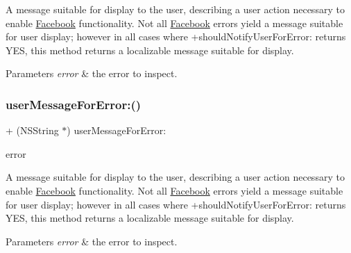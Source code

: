 A message suitable for display to the user, describing a user action necessary to enable \hyperlink{interfaceFacebook}{Facebook} functionality. Not all \hyperlink{interfaceFacebook}{Facebook} errors yield a message suitable for user display; however in all cases where +should\+Notify\+User\+For\+Error\+: returns Y\+ES, this method returns a localizable message suitable for display.


\begin{DoxyParams}{Parameters}
{\em error} & the error to inspect. \\
\hline
\end{DoxyParams}
\mbox{\label{interfaceFBErrorUtility_a059cc6fc35dd8fd3a13ee584ca7bb391}} 
\subsubsection{\texorpdfstring{user\+Message\+For\+Error\+:()}{userMessageForError:()}\hspace{0.1cm}{\footnotesize\ttfamily [2/5]}}
{\footnotesize\ttfamily + (N\+S\+String $\ast$) user\+Message\+For\+Error\+: \begin{DoxyParamCaption}\item[{(N\+S\+Error $\ast$)}]{error }\end{DoxyParamCaption}}

A message suitable for display to the user, describing a user action necessary to enable \hyperlink{interfaceFacebook}{Facebook} functionality. Not all \hyperlink{interfaceFacebook}{Facebook} errors yield a message suitable for user display; however in all cases where +should\+Notify\+User\+For\+Error\+: returns Y\+ES, this method returns a localizable message suitable for display.


\begin{DoxyParams}{Parameters}
{\em error} & the error to inspect. \\
\hline
\end{DoxyParams}
\mbox{\label{interfaceFBErrorUtility_a059cc6fc35dd8fd3a13ee584ca7bb391}} 
